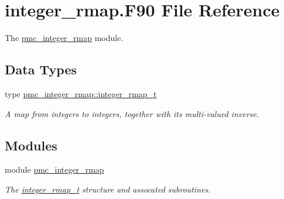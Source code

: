 \hypertarget{integer__rmap_8_f90}{}\section{integer\+\_\+rmap.\+F90 File Reference}
\label{integer__rmap_8_f90}


The \mbox{\hyperlink{namespacepmc__integer__rmap}{pmc\+\_\+integer\+\_\+rmap}} module.  


\subsection*{Data Types}
\begin{DoxyCompactItemize}
\item 
type \mbox{\hyperlink{structpmc__integer__rmap_1_1integer__rmap__t}{pmc\+\_\+integer\+\_\+rmap\+::integer\+\_\+rmap\+\_\+t}}
\begin{DoxyCompactList}\small\item\em A map from integers to integers, together with its multi-\/valued inverse. \end{DoxyCompactList}\end{DoxyCompactItemize}
\subsection*{Modules}
\begin{DoxyCompactItemize}
\item 
module \mbox{\hyperlink{namespacepmc__integer__rmap}{pmc\+\_\+integer\+\_\+rmap}}
\begin{DoxyCompactList}\small\item\em The \mbox{\hyperlink{structpmc__integer__rmap_1_1integer__rmap__t}{integer\+\_\+rmap\+\_\+t}} structure and assocated subroutines. \end{DoxyCompactList}\end{DoxyCompactItemize}
